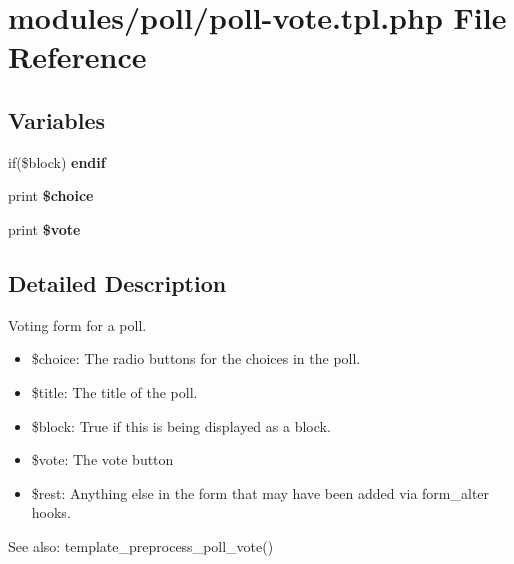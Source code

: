 \hypertarget{poll-vote_8tpl_8php}{
\section{modules/poll/poll-vote.tpl.php File Reference}
\label{poll-vote_8tpl_8php}
}
\subsection*{Variables}
\begin{CompactItemize}
\item 
\hypertarget{poll-vote_8tpl_8php_2a3e15bb5e0945e9a2f02cb9255d85b1}{
if(\$block) \textbf{endif}}
\label{poll-vote_8tpl_8php_2a3e15bb5e0945e9a2f02cb9255d85b1}

\item 
\hypertarget{poll-vote_8tpl_8php_a3f0cb9a60ba47d1b0d8040476207796}{
print \textbf{\$choice}}
\label{poll-vote_8tpl_8php_a3f0cb9a60ba47d1b0d8040476207796}

\item 
\hypertarget{poll-vote_8tpl_8php_827c3e4a1b17dbe0a4760d53352bcba0}{
print \textbf{\$vote}}
\label{poll-vote_8tpl_8php_827c3e4a1b17dbe0a4760d53352bcba0}

\end{CompactItemize}


\subsection{Detailed Description}
Voting form for a poll.

\begin{itemize}
\item \$choice: The radio buttons for the choices in the poll.\item \$title: The title of the poll.\item \$block: True if this is being displayed as a block.\item \$vote: The vote button\item \$rest: Anything else in the form that may have been added via form\_\-alter hooks.\end{itemize}


\begin{Desc}
\item[See also:]template\_\-preprocess\_\-poll\_\-vote() \end{Desc}
